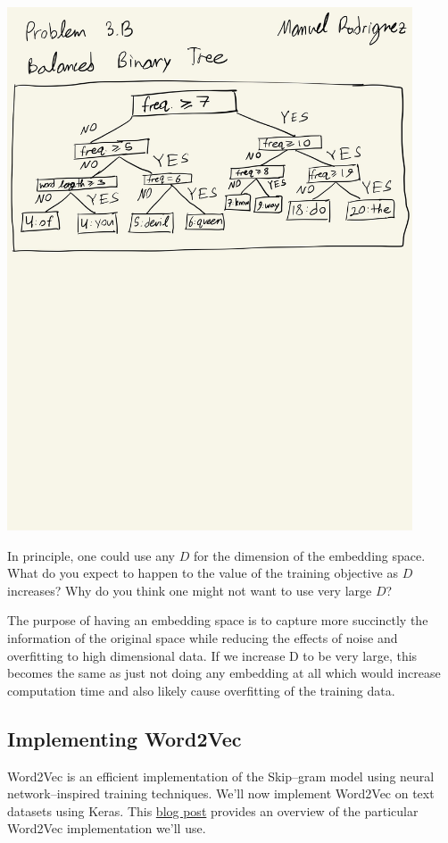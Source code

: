 \begin{solution}
	\\ \includegraphics[width=12cm]{plots/CS 155 PS5-6.jpg}
\end{solution}


\problem[3]
In principle, one could use any $D$ for the dimension of the embedding space.  What do you expect to happen to the value of the training objective as $D$ increases?  Why do you think one might not want to use very large $D$?

\begin{solution}
	The purpose of having an embedding space is to capture more succinctly the information of the original space while reducing the effects of noise and overfitting to high dimensional data. If we increase D to be very large, this becomes the same as just not doing any embedding at all which would increase computation time and also likely cause overfitting of the training data.
\end{solution}

\subsection{Implementing Word2Vec}
Word2Vec is an efficient implementation of the Skip--gram model using neural network--inspired training techniques. We'll now implement Word2Vec on text datasets using Keras.  This 
\href{http://mccormickml.com/2016/04/19/word2vec-tutorial-the-skip-gram-model/}{blog post} provides an overview of the particular Word2Vec implementation we'll use.

